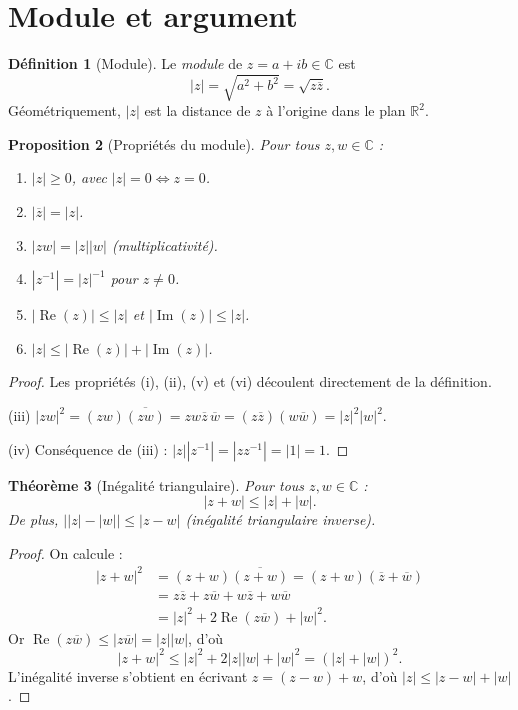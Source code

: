 \documentclass[12pt,a4paper,openany]{book}
\theoremstyle{definition}
\newtheorem{definition}{Définition}[chapter]
\theoremstyle{plain}
\newtheorem{theoreme}[definition]{Théorème}
\newtheorem{proposition}[definition]{Proposition}
\theoremstyle{remark}
\newcommand{\C}{\mathbb{C}}
\newcommand{\R}{\mathbb{R}}
\DeclareMathOperator{\re}{Re}
\DeclareMathOperator{\im}{Im}
\newcommand{\abs}[1]{\left|#1\right|}
\newcommand{\conj}[1]{\overline{#1}}
\begin{document}
\section{Module et argument}\label{sec:module-argument}

\begin{definition}[Module]\label{def:module}
Le \emph{module} de $z = a + ib \in \C$ est
\[
  \abs{z} = \sqrt{a^2 + b^2} = \sqrt{z\conj{z}}.
\]
Géométriquement, $\abs{z}$ est la distance de $z$ à l'origine dans le plan $\R^2$.
\end{definition}

\begin{proposition}[Propriétés du module]\label{prop:proprietes-module}
Pour tous $z, w \in \C$ :
\begin{enumerate}[label=(\roman*)]
  \item $\abs{z} \geq 0$, avec $\abs{z} = 0 \iff z = 0$.
  \item $\abs{\conj{z}} = \abs{z}$.
  \item $\abs{zw} = \abs{z}\abs{w}$ \quad (multiplicativité).
  \item $\abs{z^{-1}} = \abs{z}^{-1}$ pour $z \neq 0$.
  \item $\abs{\re(z)} \leq \abs{z}$ et $\abs{\im(z)} \leq \abs{z}$.
  \item $\abs{z} \leq \abs{\re(z)} + \abs{\im(z)}$.
\end{enumerate}
\end{proposition}

\begin{proof}
Les propriétés (i), (ii), (v) et (vi) découlent directement de la définition.

(iii) $\abs{zw}^2 = (zw)\conj{(zw)} = zw\conj{z}\,\conj{w} = (z\conj{z})(w\conj{w}) = \abs{z}^2\abs{w}^2$.

(iv) Conséquence de (iii) : $\abs{z}\abs{z^{-1}} = \abs{zz^{-1}} = \abs{1} = 1$.
\end{proof}

\begin{theoreme}[Inégalité triangulaire]\label{thm:inegalite-triangulaire}
Pour tous $z, w \in \C$ :
\[
  \abs{z + w} \leq \abs{z} + \abs{w}.
\]
De plus, $\bigl|\abs{z} - \abs{w}\bigr| \leq \abs{z - w}$ (inégalité triangulaire inverse).
\end{theoreme}

\begin{proof}
On calcule :
\begin{align*}
  \abs{z + w}^2 &= (z+w)\conj{(z+w)} = (z+w)(\conj{z}+\conj{w}) \\
  &= z\conj{z} + z\conj{w} + w\conj{z} + w\conj{w} \\
  &= \abs{z}^2 + 2\re(z\conj{w}) + \abs{w}^2.
\end{align*}
Or $\re(z\conj{w}) \leq \abs{z\conj{w}} = \abs{z}\abs{w}$, d'où
\[
  \abs{z+w}^2 \leq \abs{z}^2 + 2\abs{z}\abs{w} + \abs{w}^2 = (\abs{z} + \abs{w})^2.
\]
L'inégalité inverse s'obtient en écrivant $z = (z-w) + w$, d'où $\abs{z} \leq \abs{z-w} + \abs{w}$.
\end{proof}
\end{document}
